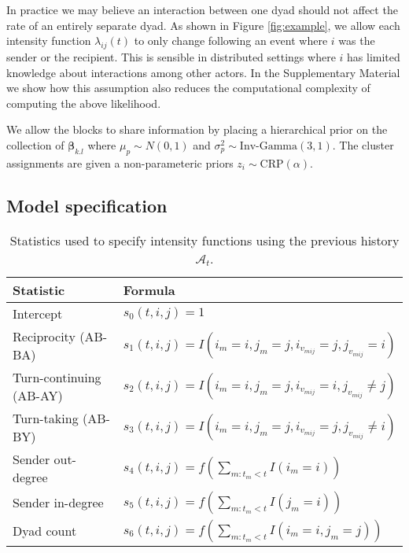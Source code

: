  In practice we may believe an interaction between one dyad should not affect the rate of an entirely separate dyad.
As shown in Figure \ref{fig:example}, we allow each intensity function $\lambda_{ij}(t)$ to only change following an event where $i$ was the sender or the recipient.
This is sensible in distributed settings where $i$ has limited knowledge about interactions among other actors.
In the Supplementary Material we show how this assumption also reduces the computational complexity of computing the above likelihood.

We allow the blocks to share information by placing a hierarchical prior on the collection of $\boldsymbol{\beta}_{k.l}$ where $\mu_p \sim N(0,1)$ and $\sigma_p^2 \sim \mbox{Inv-Gamma}(3,1)$.
The cluster assignments are given a non-parameteric priors $z_i \sim \mbox{CRP}(\alpha)$.

\subsection{Model specification}

\begin{table}[t]
\footnotesize
\center
\begin{tabular}{|l|l|}
\hline
Statistic & Formula \\
\hline
\hline
Intercept& $s_{0}(t,i,j) = 1$\\
Reciprocity (AB-BA)& $s_{1}(t,i,j) = I(i_m=i,j_m=j,i_{v_{mij}}=j,j_{v_{mij}}=i)$\\
Turn-continuing (AB-AY)& $s_{2}(t,i,j) =  I(i_m=i,j_m=j,i_{v_{mij}}=i,j_{v_{mij}}\ne j)$\\
Turn-taking (AB-BY)&$s_{3}(t,i,j) = I(i_m=i,j_m=j,i_{v_{mij}}=j,j_{v_{mij}}\ne i)$\\
Sender out-degree& $s_{4}(t,i,j) = f(\sum_{m:t_m<t} I(i_m=i) )$\\
Sender in-degree& $s_{5}(t,i,j) = f(\sum_{m:t_m<t} I(j_m=i) )$\\
Dyad count& $s_{6}(t,i,j) = f(\sum_{m:t_m<t} I(i_m=i,j_m=j) )$\\
\hline
\end{tabular}
\label{tab:stats}
\caption{Statistics used to specify intensity functions using the previous history $\mathcal{A}_t$.}
\end{table}



